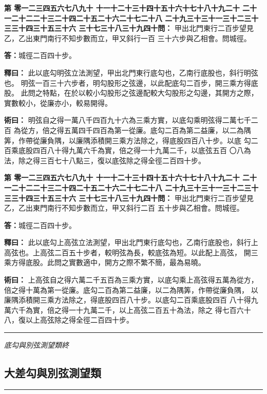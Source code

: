 \documentclass[11pt,a4paper]{article}
\newcommand{\longline}{\noindent\rule{\textwidth}{0.4pt}}
\newcounter{probnum}
\newcommand{\chnum}[1]{%
  \ifcase#1 零\or 一\or 二\or 三\or 四\or 五\or 六\or 七\or 八\or 九\or 十\or
    十一\or 十二\or 十三\or 十四\or 十五\or 十六\or 十七\or 十八\or 十九\or 二十\or
    二十一\or 二十二\or 二十三\or 二十四\or 二十五\or 二十六\or 二十七\or 二十八\or
    二十九\or 三十\or 三十一\or 三十二\or 三十三\or 三十四\or 三十五\or 三十六\or
    三十七\or 三十八\or 三十九\or 四十\fi}
\newcommand{\problem}[1]{\stepcounter{probnum}\par\noindent\textbf{第\chnum{\value{probnum}}問：}#1\par}
\newcommand{\answer}[1]{\par\noindent\textbf{答：}#1\par}
\newcommand{\shiyi}[1]{\par\noindent\textbf{釋曰：}#1\par}
\newcommand{\shuyue}[1]{\par\noindent\textbf{術曰：}#1\par}
\begin{document}
\vspace{0.3cm}
\problem{
甲出北門東行二百步望見乙，乙出東門南行不知步數而立，甲又斜行一百
三十六步與乙相會。問城徑。
}

\answer{城徑二百四十步。}

\shiyi{
此以底勾明弦立法測望，甲出北門東行底勾也，乙南行底股也，斜行明弦也。
明弦一百三十六步者，明勾股形之弦邊，以此配底勾二百步，開三乘方得底股。
此問之特點，在於以較小勾股形之弦邊配較大勾股形之勾邊，其開方之際，
實數較小，從廉亦小，較易開得。
}

\shuyue{
明弦自之得一萬八千四百九十六為三乘方實，以底勾乘明弦得二萬七千二百
為從方，倍之得五萬四千四百為第一從廉。底勾二百為第二益廉，以二為隅
筭，作帶從廉負隅，以廉隅添積開三乘方法除之，得底股四百八十步。以底
勾二百乘底股四百八十得九萬六千為實，倍之得一十九萬二千，以底弦五百
〇八為法，除之得三百七十八點三，復以底弦除之得全徑二百四十步。
}

\vspace{0.3cm}
\problem{
甲出北門東行二百步望見乙，乙出東門南行不知步數而立，甲又斜行二百
五十步與乙相會。問城徑。
}

\answer{城徑二百四十步。}

\shiyi{
此以底勾上高弦立法測望，甲出北門東行底勾也，乙南行底股也，斜行上
高弦也。上高弦二百五十步者，較明弦為長，較底弦為短。以此配上高弦，
開三乘方得底股。此問之實數適中，開方之際不繁不簡，最為易曉。
}

\shuyue{
上高弦自之得六萬二千五百為三乘方實，以底勾乘上高弦得五萬為從方，
倍之得十萬為第一從廉。底勾二百為第二益廉，以二為隅筭，作帶從廉負隅，
以廉隅添積開三乘方法除之，得底股四百八十步。以底勾二百乘底股四百
八十得九萬六千為實，倍之得一十九萬二千，以上高弦二百五十為法，除之
得七百六十八，復以上高弦除之得全徑二百四十步。
}

\vspace{0.5cm}
\longline
\begin{center}
\textit{底勾與別弦測望類終}
\end{center}

\newpage
\setcounter{probnum}{0}

\subsection*{大差勾與別弦測望類}
\vspace{0.3cm}
\longline
\vspace{0.3cm}
\end{document}
